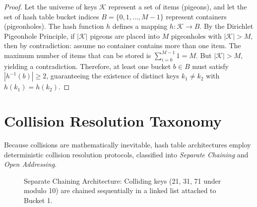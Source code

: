 \documentclass[10pt,twocolumn,letterpaper]{article}
\begin{document}
\begin{proof}
Let the universe of keys $\mathcal{K}$ represent a set of items (pigeons), and let the set of hash table bucket indices $B = \{0, 1, \dots, M-1\}$ represent containers (pigeonholes). The hash function $h$ defines a mapping $h: \mathcal{K} \to B$. 
By the Dirichlet Pigeonhole Principle, if $|\mathcal{K}|$ pigeons are placed into $M$ pigeonholes with $|\mathcal{K}| > M$, then by contradiction: assume no container contains more than one item. The maximum number of items that can be stored is $\sum_{i=0}^{M-1} 1 = M$. But $|\mathcal{K}| > M$, yielding a contradiction. Therefore, at least one bucket $b \in B$ must satisfy $|h^{-1}(b)| \ge 2$, guaranteeing the existence of distinct keys $k_1 \neq k_2$ with $h(k_1) = h(k_2)$.
\end{proof}

\section{Collision Resolution Taxonomy}
\label{sec:collision-resolution}

Because collisions are mathematically inevitable, hash table architectures employ deterministic collision resolution protocols, classified into \emph{Separate Chaining} and \emph{Open Addressing}.

\begin{figure}[htbp]
\centering
{}
\caption{Separate Chaining Architecture: Colliding keys (21, 31, 71 under modulo 10) are chained sequentially in a linked list attached to Bucket 1.}
\label{fig:chaining}
\end{figure}
\end{document}
